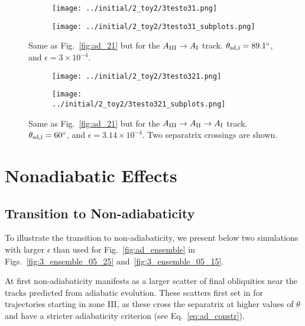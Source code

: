 \documentclass[
        fleqn,
        usenatbib,
        referee,
    ]{mnras}
\begin{document}
\begin{figure}
    \centering
    \begin{subfigure}{\columnwidth}
        \centering
        \texttt{[image: ../initial/2\_toy2/3testo31.png]}
    \end{subfigure}
    \begin{subfigure}{\columnwidth}
        \centering
        \texttt{[image: ../initial/2\_toy2/3testo31\_subplots.png]}
    \end{subfigure}
    \caption{Same as Fig.~\ref{fig:ad_21} but for the $A_{\rm III} \to A_{\rm I}$
    track. $\theta_{\rm sd, i} = 89.1^\circ$, and $\epsilon = 3 \times
    10^{-4}$.}\label{fig:ad_31}
\end{figure}
\begin{figure}
    \centering
    \begin{subfigure}{\columnwidth}
        \centering
        \texttt{[image: ../initial/2\_toy2/3testo321.png]}
    \end{subfigure}
    \begin{subfigure}{\columnwidth}
        \centering
        \texttt{[image: ../initial/2\_toy2/3testo321\_subplots.png]}
    \end{subfigure}
    \caption{Same as Fig.~\ref{fig:ad_21} but for the $A_{\rm III} \to A_{\rm II}
    \to A_{\rm I}$ track. $\theta_{\rm sd, i} = 60^\circ$, and $\epsilon = 3.14
    \times 10^{-4}$. Two separatrix crossings are shown.}\label{fig:ad_321}
\end{figure}

\section{Nonadiabatic Effects}\label{s:nonad}

\subsection{Transition to Non-adiabaticity}\label{ss:transition}

To illustrate the transition to non-adiabaticity, we present below two
simulations with larger $\epsilon$ than used for Fig.~\ref{fig:ad_ensemble} in
Figs.~\ref{fig:3_ensemble_05_25} and~\ref{fig:3_ensemble_05_15}.

At first non-adiabaticity manifests as a larger scatter of final obliquities
near the tracks predicted from adiabatic evolution. These scatters first set in
for trajectories starting in zone III, as these cross the separatrix at higher
values of $\theta$ and have a stricter adiabaticity criterion (see
Eq.~\eqref{eq:ad_constr}).
\end{document}
